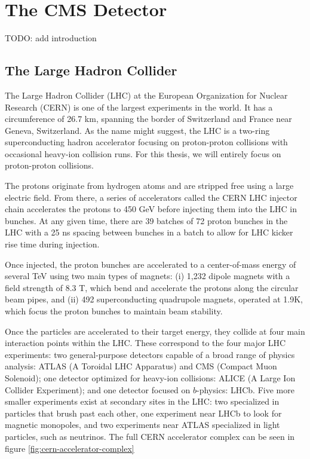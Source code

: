 \chapter{The CMS Detector}

TODO: add introduction

\section{The Large Hadron Collider}

The Large Hadron Collider (LHC) at the European Organization for Nuclear Research (CERN) is one of the largest experiments in the world. It has a circumference of 26.7 km, spanning the border of Switzerland and France near Geneva, Switzerland. As the name might suggest, the LHC is a two-ring superconducting hadron accelerator focusing on proton-proton collisions with occasional heavy-ion collision runs. For this thesis, we will entirely focus on proton-proton collisions.

The protons originate from hydrogen atoms and are stripped free using a large electric field. From there, a series of accelerators called the CERN LHC injector chain accelerates the protons to 450 GeV before injecting them into the LHC in bunches. At any given time, there are 39 batches of 72 proton bunches in the LHC with a 25 ns spacing between bunches in a batch to allow for LHC kicker rise time during injection. 

Once injected, the proton bunches are accelerated to a center-of-mass energy of several TeV using two main types of magnets: (i) 1,232 dipole magnets with a field strength of 8.3 T, which bend and accelerate the protons along the circular beam pipes, and (ii) 492 superconducting quadrupole magnets, operated at 1.9\textdegree K, which focus the proton bunches to maintain beam stability.

Once the particles are accelerated to their target energy, they collide at four main interaction points within the LHC. These correspond to the four major LHC experiments: two general-purpose detectors capable of a broad range of physics analysis: ATLAS (A Toroidal LHC Apparatus) and CMS (Compact Muon Solenoid); one detector optimized for heavy-ion collisions: ALICE (A Large Ion Collider Experiment); and one detector focused on $b$-physics: LHCb. Five more smaller experiments exist at secondary sites in the LHC: two specialized in particles that brush past each other, one experiment near LHCb to look for magnetic monopoles, and two experiments near ATLAS specialized in light particles, such as neutrinos. The full CERN accelerator complex can be seen in figure \ref{fig:cern-accelerator-complex}

